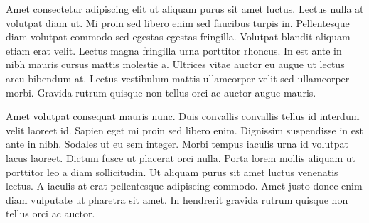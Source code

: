 Amet consectetur adipiscing elit ut aliquam purus sit amet luctus. Lectus nulla at volutpat diam ut. Mi proin sed libero enim sed faucibus turpis in. Pellentesque diam volutpat commodo sed egestas egestas fringilla. Volutpat blandit aliquam etiam erat velit. Lectus magna fringilla urna porttitor rhoncus. In est ante in nibh mauris cursus mattis molestie a. Ultrices vitae auctor eu augue ut lectus arcu bibendum at. Lectus vestibulum mattis ullamcorper velit sed ullamcorper morbi. Gravida rutrum quisque non tellus orci ac auctor augue mauris.

Amet volutpat consequat mauris nunc. Duis convallis convallis tellus id interdum velit laoreet id. Sapien eget mi proin sed libero enim. Dignissim suspendisse in est ante in nibh. Sodales ut eu sem integer. Morbi tempus iaculis urna id volutpat lacus laoreet. Dictum fusce ut placerat orci nulla. Porta lorem mollis aliquam ut porttitor leo a diam sollicitudin. Ut aliquam purus sit amet luctus venenatis lectus. A iaculis at erat pellentesque adipiscing commodo. Amet justo donec enim diam vulputate ut pharetra sit amet. In hendrerit gravida rutrum quisque non tellus orci ac auctor.